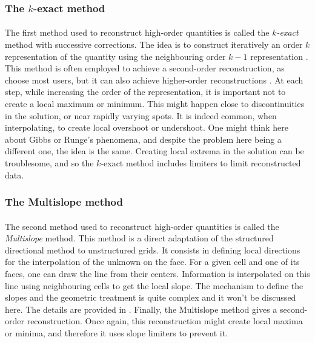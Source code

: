       \subsubsection{The $k$-exact method}

        \paragraph{}
        The first method used to reconstruct high-order quantities is called the \emph{$k$-exact} method with successive corrections.
        The idea is to construct iteratively an order $k$ representation of the quantity using the neighbouring order $k-1$ representation \cite{HaiderCroisilleCourbet2009}.
        This method is often employed to achieve a second-order reconstruction, as choose most users, but it can also achieve higher-order reconstructions \cite{HaiderCroisilleCourbet2011, HaiderCourbetCroisille2018, PontBrennerCinellaEtAl2017}.
        At each step, while increasing the order of the representation, it is important not to create a local maximum or minimum.
        This might happen close to discontinuities in the solution, or near rapidly varying spots.
        It is indeed common, when interpolating, to create local overshoot or undershoot.
        One might think here about Gibbs or Runge's phenomena, and despite the problem here being a different one, the idea is the same.
        Creating local extrema in the solution can be troublesome, and so the $k$-exact method includes limiters to limit reconstructed data.


      \subsubsection{The Multislope method}

        \paragraph{}
        The second method used to reconstruct high-order quantities is called the \emph{Multislope} method.
        This method is a direct adaptation of the structured directional method to unstructured grids.
        It consists in defining local directions for the interpolation of the unknown on the face.
        For a given cell and one of its faces, one can draw the line from their centers.
        Information is interpolated on this line using neighbouring cells to get the local slope.
        The mechanism to define the slopes and the geometric treatment is quite complex and it won't be discussed here.
        The details are provided in \cite{LeTouzeMurroneGuillard2015}.
        Finally, the Multislope method gives a second-order reconstruction.
        Once again, this reconstruction might create local maxima or minima, and therefore it uses slope limiters \cite{Venkatakrishnan1993, BergerAftosmis2005} to prevent it.


